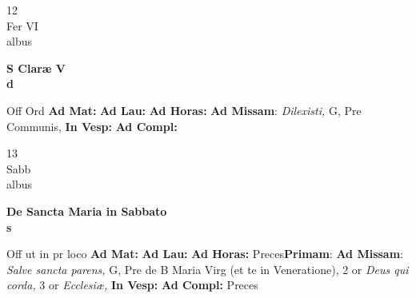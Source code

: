 \documentclass[10pt, openany]{book}
\begin{document}
        \begin{center}
            \begin{minipage}{3.5in}
                \vspace{2em}
                \begin{minipage}{0.5in}
                    {\Huge 12} \\
                    {\normalsize Fer VI} \\
                    {\normalsize albus}
                \end{minipage}
                \begin{minipage}{3.0in}
                    \textbf{ \large S Claræ V \\
                    \textnormal{\normalsize d}} \\ 
                \end{minipage}
                \begin{justify}Off Ord
                    \textbf{Ad Mat: }
                    \textbf{Ad Lau: }
                    \textbf{Ad Horas: }\textbf{Ad Missam}: \textit{Dilexisti,} G, Pre Communis,  
                    \textbf{In Vesp: }
                    \textbf{Ad Compl: }
                \end{justify}
            \end{minipage}
        \end{center}
    
        \begin{center}
            \begin{minipage}{3.5in}
                \vspace{2em}
                \begin{minipage}{0.5in}
                    {\Huge 13} \\
                    {\normalsize Sabb} \\
                    {\normalsize albus}
                \end{minipage}
                \begin{minipage}{3.0in}
                    \textbf{ \large De Sancta Maria in Sabbato \\
                    \textnormal{\normalsize s}} \\ 
                \end{minipage}
                \begin{justify}Off ut in pr loco
                    \textbf{Ad Mat: }
                    \textbf{Ad Lau: }
                    \textbf{Ad Horas: }Preces\textbf{Primam}: \textbf{Ad Missam}: \textit{Salve sancta parens,} G, Pre de B Maria Virg (et te in Veneratione), 2 or \textit{Deus qui corda,} 3 or \textit{Ecclesiæ,}  
                    \textbf{In Vesp: }
                    \textbf{Ad Compl: }Preces
                \end{justify}
            \end{minipage}
        \end{center}
    
\end{document}
